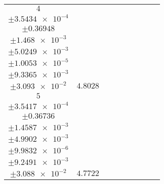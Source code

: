 \documentclass[8pt]{article}
\begin{document}
\begin{longtable}[l]{c c c c c c c c c}
$\num{4}$ & \begin{tabular}[c]{@{}c@{}}$\num{5.5378e-2}$ \\ $\pm\num{3.5434e-4}$\end{tabular} & \begin{tabular}[c]{@{}c@{}}$\num{0.67952}$ \\ $\pm\num{0.36948}$\end{tabular} & \begin{tabular}[c]{@{}c@{}}$\num{9.9652}$ \\ $\pm\num{1.468e-3}$\end{tabular} & \begin{tabular}[c]{@{}c@{}}$\num{2.0412e+3}$ \\ $\pm\num{5.0249e-3}$\end{tabular} & \begin{tabular}[c]{@{}c@{}}$\num{4.0836}$ \\ $\pm\num{1.0053e-5}$\end{tabular} & \begin{tabular}[c]{@{}c@{}}$\num{1.1941}$ \\ $\pm\num{9.3365e-3}$\end{tabular} & \begin{tabular}[c]{@{}c@{}}$\num{4.1965}$ \\ $\pm\num{3.093e-2}$\end{tabular} & $\num{4.8028}$\\
$\num{5}$ & \begin{tabular}[c]{@{}c@{}}$\num{5.5565e-2}$ \\ $\pm\num{3.5417e-4}$\end{tabular} & \begin{tabular}[c]{@{}c@{}}$\num{-1.0022}$ \\ $\pm\num{0.36736}$\end{tabular} & \begin{tabular}[c]{@{}c@{}}$\num{-10.382}$ \\ $\pm\num{1.4587e-3}$\end{tabular} & \begin{tabular}[c]{@{}c@{}}$\num{2.0641e+3}$ \\ $\pm\num{4.9902e-3}$\end{tabular} & \begin{tabular}[c]{@{}c@{}}$\num{4.1294}$ \\ $\pm\num{9.9832e-6}$\end{tabular} & \begin{tabular}[c]{@{}c@{}}$\num{1.1897}$ \\ $\pm\num{9.2491e-3}$\end{tabular} & \begin{tabular}[c]{@{}c@{}}$\num{4.199}$ \\ $\pm\num{3.088e-2}$\end{tabular} & $\num{4.7722}$\\

\end{longtable}
\end{document}

